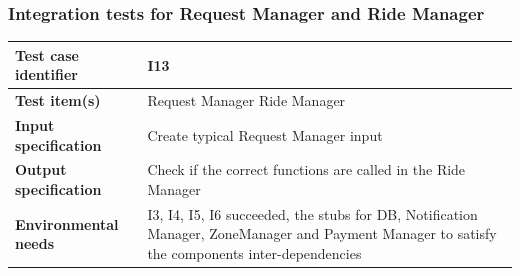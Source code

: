\documentclass[a4paper,11pt]{report} %
\begin{document}
		\subsubsection{Integration tests for Request Manager and Ride Manager} \label{sec:3.1.10}
			\begin{minipage}{\linewidth}
			\end{minipage}		
		\begin{center}
			\renewcommand{\arraystretch}{1.2}
			\setlength{\tabcolsep}{24pt}
			\begin{tabular}{ l  p{9cm}}\hline
				\textbf{Test case identifier} & I13\\\hline
				\textbf{Test item(s)} & Request Manager \textrightarrow Ride Manager\\\hline
				\textbf{Input specification} & Create typical Request Manager input \\\hline
				\textbf{Output specification} & Check if the correct functions are called in the Ride Manager\\\hline
				\textbf{Environmental needs} & I3, I4, I5, I6 succeeded, the stubs for DB, Notification Manager, ZoneManager and Payment Manager to satisfy the components inter-dependencies\\\hline
			\end{tabular}
		\end{center}		
		
		\bigskip
\end{document}
